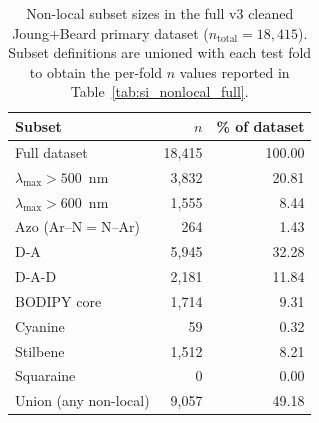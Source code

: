 \documentclass[journal=jcisd8,manuscript=suppinfo]{achemso}
\begin{document}
\begin{table}[htbp]
\centering
\caption{Non-local subset sizes in the full v3 cleaned Joung+Beard primary dataset ($n_{\text{total}} = 18{,}415$). Subset definitions are unioned with each test fold to obtain the per-fold $n$ values reported in Table~\ref{tab:si_nonlocal_full}.}
\label{tab:si_subset_counts}
\small
\begin{tabular}{lrr}
\toprule
\textbf{Subset} & $n$ & \textbf{\% of dataset} \\
\midrule
Full dataset & 18{,}415 & 100.00 \\
$\lambda_{\max} > 500$~nm & 3{,}832 & 20.81 \\
$\lambda_{\max} > 600$~nm & 1{,}555 & 8.44 \\
Azo (Ar--N$=$N--Ar) & 264 & 1.43 \\
D-A & 5{,}945 & 32.28 \\
D-A-D & 2{,}181 & 11.84 \\
BODIPY core & 1{,}714 & 9.31 \\
Cyanine & 59 & 0.32 \\
Stilbene & 1{,}512 & 8.21 \\
Squaraine & 0 & 0.00 \\
\midrule
Union (any non-local) & 9{,}057 & 49.18 \\
\bottomrule
\end{tabular}
\end{table}
\end{document}
